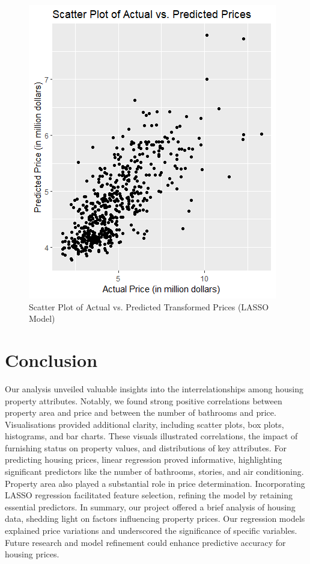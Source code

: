 \documentclass[10pt]{article}
\begin{document}
\begin{figure}[H]
\renewcommand{\arraystretch}{0.6} %
  \centering
  \includegraphics[width=0.6\linewidth, height=0.5\linewidth]{Final project/Visualizations/Scatterplot3.png}
  \caption{Scatter Plot of Actual vs. Predicted Transformed Prices (LASSO Model)}
  \label{fig:4}
\end{figure}



\section{Conclusion}

Our analysis unveiled valuable insights into the interrelationships among housing property attributes. Notably, we found strong positive correlations between property area and price and between the number of bathrooms and price. Visualisations provided additional clarity, including scatter plots, box plots, histograms, and bar charts. These visuals illustrated correlations, the impact of furnishing status on property values, and distributions of key attributes. For predicting housing prices, linear regression proved informative, highlighting significant predictors like the number of bathrooms, stories, and air conditioning. Property area also played a substantial role in price determination. Incorporating LASSO regression facilitated feature selection, refining the model by retaining essential predictors. In summary, our project offered a brief analysis of housing data, shedding light on factors influencing property prices. Our regression models explained price variations and underscored the significance of specific variables.  Future research and model refinement could enhance predictive accuracy for housing prices.
\end{document}
